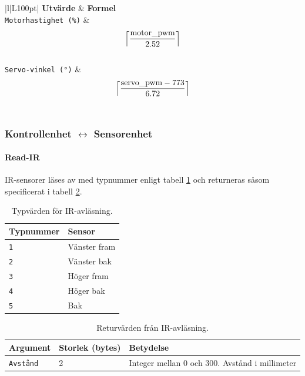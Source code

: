 \documentclass[a4paper,11pt]{article}
\begin{document}
\begin{table}[h!]
	\centering
	\begin{tabular}{|l|L{100pt}|}
		\hline
		\textbf{Utvärde} & \textbf{Formel} \\ \hline
		\texttt{Motorhastighet (\%)} & \[ \Bigl\lceil \dfrac{\text{motor\_pwm}}{2.52}\Bigr\rceil \] \\
		\texttt{Servo-vinkel (\si{\degree})} &  \[ \Bigl\lceil \dfrac{\text{servo\_pwm}-773}{6.72}\Bigr\rceil \] \\ \hline
	\end{tabular}
	\caption{Beräkning av hastighet och vinkel från PWM-värden.}
	\label{tab:pwm_to_values}
\end{table}

\subsubsection{Kontrollenhet $\leftrightarrow$ Sensorenhet}
\paragraph{Read-IR}
\label{sec:sensorCommunication}
IR-sensorer läses av med typnummer enligt tabell \ref{table:irtypes} och returneras såsom specificerat i tabell \ref{tab:ir}.

\begin{table}[h!]
    \centering
    \begin{tabular}{|l|l|}
    \rowcolor{gray!50}
    	\hline
    \textbf{Typnummer} & \textbf{Sensor} \\ \hline
    \texttt{1} & Vänster fram \\
    \texttt{2} & Vänster bak \\
    \texttt{3} & Höger fram \\
    \texttt{4} & Höger bak  \\
    \texttt{5} & Bak \\ \hline
    \end{tabular}
    \caption{Typvärden för IR-avläsning.}
    \label{table:irtypes}
\end{table}


\begin{table}[h!]
    \centering
    \begin{tabular}{|l|l|l|}
    \rowcolor{gray!50}
    	\hline
    	\textbf{Argument} & \textbf{Storlek (bytes)} & \textbf{Betydelse} \\ \hline
    	\texttt{Avstånd} & 2 & Integer mellan 0 och 300. Avstånd i millimeter \\ \hline
    \end{tabular}
    \caption{Returvärden från IR-avläsning.}
    \label{tab:ir}
\end{table}
\end{document}
